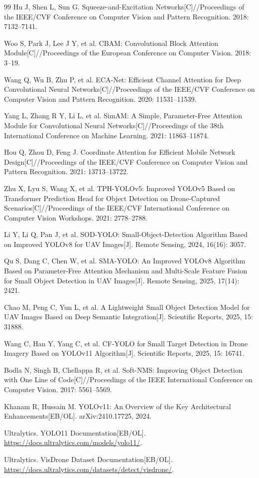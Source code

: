 \documentclass[UTF8,a4paper,10.5pt,fontset=windows]{ctexart}
\begin{document}
\begin{thebibliography}{99}
Hu J, Shen L, Sun G. Squeeze-and-Excitation Networks[C]//Proceedings of the IEEE/CVF Conference on Computer Vision and Pattern Recognition. 2018: 7132--7141.

Woo S, Park J, Lee J Y, et al. CBAM: Convolutional Block Attention Module[C]//Proceedings of the European Conference on Computer Vision. 2018: 3--19.

Wang Q, Wu B, Zhu P, et al. ECA-Net: Efficient Channel Attention for Deep Convolutional Neural Networks[C]//Proceedings of the IEEE/CVF Conference on Computer Vision and Pattern Recognition. 2020: 11531--11539.

Yang L, Zhang R Y, Li L, et al. SimAM: A Simple, Parameter-Free Attention Module for Convolutional Neural Networks[C]//Proceedings of the 38th International Conference on Machine Learning. 2021: 11863--11874.

Hou Q, Zhou D, Feng J. Coordinate Attention for Efficient Mobile Network \mbox{Design}[C]//Proceedings of the IEEE/CVF Conference on Computer Vision and Pattern \mbox{Recognition}. 2021: 13713--13722.

Zhu X, Lyu S, Wang X, et al. TPH-YOLOv5: Improved YOLOv5 Based on Transformer Prediction Head for Object Detection on Drone-Captured Scenarios[C]//Proceedings of the IEEE/CVF International Conference on Computer Vision Workshops. 2021: 2778--2788.

Li Y, Li Q, Pan J, et al. SOD-YOLO: Small-Object-Detection Algorithm Based on Improved YOLOv8 for UAV Images[J]. Remote Sensing, 2024, 16(16): 3057.

Qu S, Dang C, Chen W, et al. SMA-YOLO: An Improved YOLOv8 Algorithm Based on Parameter-Free Attention Mechanism and Multi-Scale Feature Fusion for Small Object Detection in UAV Images[J]. Remote Sensing, 2025, 17(14): 2421.

Chao M, Peng C, Yun L, et al. A Lightweight Small Object Detection Model for UAV Images Based on Deep Semantic Integration[J]. Scientific Reports, 2025, 15: 31888.

Wang C, Han Y, Yang C, et al. CF-YOLO for Small Target Detection in Drone Imagery Based on YOLOv11 Algorithm[J]. Scientific Reports, 2025, 15: 16741.

Bodla N, Singh B, Chellappa R, et al. Soft-NMS: Improving Object Detection with One Line of Code[C]//Proceedings of the IEEE International Conference on Computer Vision. 2017: 5561--5569.

Khanam R, Hussain M. YOLOv11: An Overview of the Key Architectural \mbox{Enhancements}[EB/OL]. arXiv:2410.17725, 2024.

Ultralytics. YOLO11 Documentation[EB/OL]. \url{https://docs.ultralytics.com/models/yolo11/}.

Ultralytics. VisDrone Dataset Documentation[EB/OL]. \url{https://docs.ultralytics.com/datasets/detect/visdrone/}.

\end{thebibliography}
\end{document}
